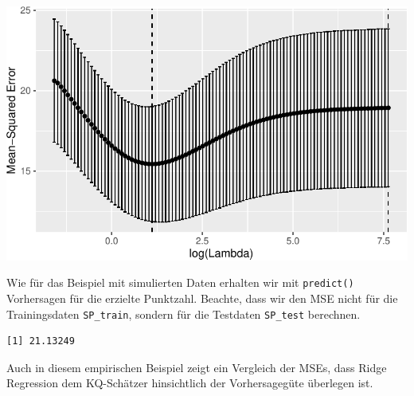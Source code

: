 \documentclass[
  a4paper,
  DIV=11,
  oneside]{scrreprt}
\newenvironment{Shaded}{\begin{snugshade}}{\end{snugshade}}
\newcommand{\AttributeTok}[1]{\textcolor[rgb]{0.40,0.45,0.13}{#1}}
\newcommand{\CommentTok}[1]{\textcolor[rgb]{0.37,0.37,0.37}{#1}}
\newcommand{\DecValTok}[1]{\textcolor[rgb]{0.68,0.00,0.00}{#1}}
\newcommand{\FunctionTok}[1]{\textcolor[rgb]{0.28,0.35,0.67}{#1}}
\newcommand{\NormalTok}[1]{\textcolor[rgb]{0.00,0.23,0.31}{#1}}
\newcommand{\OtherTok}[1]{\textcolor[rgb]{0.00,0.23,0.31}{#1}}
\newcommand{\SpecialCharTok}[1]{\textcolor[rgb]{0.37,0.37,0.37}{#1}}
\begin{document}
\includegraphics{RegReg_files/figure-pdf/unnamed-chunk-16-1.pdf}

Wie für das Beispiel mit simulierten Daten erhalten wir mit
\texttt{predict()} Vorhersagen für die erzielte Punktzahl. Beachte, dass
wir den MSE nicht für die Trainingsdaten \texttt{SP\_train}, sondern für
die Testdaten \texttt{SP\_test} berechnen.

\begin{Shaded}
\end{Shaded}

\begin{verbatim}
[1] 21.13249
\end{verbatim}

Auch in diesem empirischen Beispiel zeigt ein Vergleich der MSEs, dass
Ridge Regression dem KQ-Schätzer hinsichtlich der Vorhersagegüte
überlegen ist.
\end{document}
